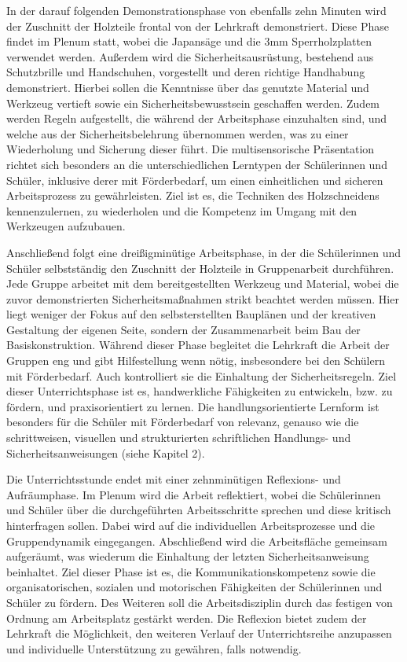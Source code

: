 \documentclass[12pt]{article}
\begin{document}
In der darauf folgenden Demonstrationsphase von ebenfalls zehn Minuten wird der Zuschnitt der Holzteile frontal von der Lehrkraft demonstriert. Diese Phase findet im Plenum statt, wobei die Japansäge und die 3mm Sperrholzplatten verwendet werden. Außerdem wird die Sicherheitsausrüstung, bestehend aus Schutzbrille und Handschuhen, vorgestellt und deren richtige Handhabung demonstriert. Hierbei sollen die Kenntnisse über das genutzte Material und Werkzeug vertieft sowie ein Sicherheitsbewusstsein geschaffen werden. Zudem werden Regeln aufgestellt, die während der Arbeitsphase einzuhalten sind, und welche aus der Sicherheitsbelehrung übernommen werden, was zu einer Wiederholung und Sicherung dieser führt. Die multisensorische Präsentation richtet sich besonders an die unterschiedlichen Lerntypen der Schülerinnen und Schüler, inklusive derer mit Förderbedarf, um einen einheitlichen und sicheren Arbeitsprozess zu gewährleisten. Ziel ist es, die Techniken des Holzschneidens kennenzulernen, zu wiederholen und die Kompetenz im Umgang mit den Werkzeugen aufzubauen.

Anschließend folgt eine dreißigminütige Arbeitsphase, in der die Schülerinnen und Schüler selbstständig den Zuschnitt der Holzteile in Gruppenarbeit durchführen. Jede Gruppe arbeitet mit dem bereitgestellten Werkzeug und Material, wobei die zuvor demonstrierten Sicherheitsmaßnahmen strikt beachtet werden müssen. Hier liegt weniger der Fokus auf den selbsterstellten Bauplänen und der kreativen Gestaltung der eigenen Seite, sondern der Zusammenarbeit beim Bau der Basiskonstruktion. Während dieser Phase begleitet die Lehrkraft die Arbeit der Gruppen eng und gibt Hilfestellung wenn nötig, insbesondere bei den Schülern mit Förderbedarf. Auch kontrolliert sie die Einhaltung der Sicherheitsregeln. Ziel dieser Unterrichtsphase ist es, handwerkliche Fähigkeiten zu entwickeln, bzw. zu fördern, und praxisorientiert zu lernen. Die handlungsorientierte Lernform ist besonders für die Schüler mit Förderbedarf von relevanz, genauso wie die schrittweisen, visuellen und strukturierten schriftlichen Handlungs- und Sicherheitsanweisungen (siehe Kapitel 2).

Die Unterrichtsstunde endet mit einer zehnminütigen Reflexions- und Aufräumphase. Im Plenum wird die Arbeit reflektiert, wobei die Schülerinnen und Schüler über die durchgeführten Arbeitsschritte sprechen und diese kritisch hinterfragen sollen. Dabei wird auf die individuellen Arbeitsprozesse und die Gruppendynamik eingegangen. Abschließend wird die Arbeitsfläche gemeinsam aufgeräumt, was wiederum die Einhaltung der letzten Sicherheitsanweisung beinhaltet. Ziel dieser Phase ist es, die Kommunikationskompetenz sowie die organisatorischen, sozialen und motorischen Fähigkeiten der Schülerinnen und Schüler zu fördern. Des Weiteren soll die Arbeitsdisziplin durch das festigen von Ordnung am Arbeitsplatz gestärkt werden. Die Reflexion bietet zudem der Lehrkraft die Möglichkeit, den weiteren Verlauf der Unterrichtsreihe anzupassen und individuelle Unterstützung zu gewähren, falls notwendig.
\end{document}

